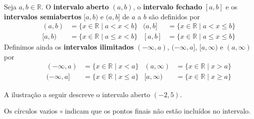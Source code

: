 \begin{definition}
\label{defIntervals}
\nindex{abint3}{$(a,b]$}{half-open interval}
\nindex{abint4}{$[a,b)$}{half-open interval}
Seja $a,b \in \mathbb{R}$. O \textbf{intervalo aberto} $(a,b)$, o \textbf{intervalo fechado} $[a,b]$ e os \textbf{intervalos semiabertos} $[a,b)$ e $( a,b]$ de $a$ a $b$ são definidos por
\begin{align*}
\hspace{35pt} (a,b) &= \{ x \in \mathbb{R} \mid a < x < b \}
&
(a,b] &= \{ x \in \mathbb{R} \mid a < x \le b \} 
\\
\hspace{35pt} [a,b) &= \{ x \in \mathbb{R} \mid a \le x < b \}
&
[a,b] &= \{ x \in \mathbb{R} \mid a \le x \le b \}
\end{align*}
Definimos ainda os \textbf{intervalos ilimitados} $(-\infty, a)$, $(-\infty, a]$, $[a, \infty)$ e $(a, \infty)$  por
\begin{align*}
\hspace{35pt} (-\infty,a) &= \{ x \in \mathbb{R} \mid x < a \}
&
(a,\infty) &= \{ x \in \mathbb{R} \mid x > a \}
\\
\hspace{35pt} (-\infty, a] &= \{ x \in \mathbb{R} \mid x \le a \} 
&
[a,\infty) &= \{ x \in \mathbb{R} \mid x \ge a \}
\end{align*}
\end{definition}

\begin{example}
A ilustração a seguir descreve o intervalo aberto $(-2,5)$.

\vspace{-10pt}
\begin{center}
\end{center}
Os círculos vazios $\circ$ indicam que os pontos finais não estão incluídos no intervalo.
\end{example}

